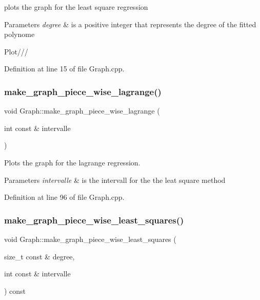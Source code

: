 plots the graph for the least square regression 


\begin{DoxyParams}{Parameters}
{\em degree} & is a positive integer that represents the degree of the fitted polynome \\
\hline
\end{DoxyParams}
Plot/// 

Definition at line 15 of file Graph.\+cpp.

\mbox{\label{class_graph_a4de7bd5074f188b470392920df1c7ada}} 
\subsubsection{\texorpdfstring{make\+\_\+graph\+\_\+piece\+\_\+wise\+\_\+lagrange()}{make\_graph\_piece\_wise\_lagrange()}}
{\footnotesize\ttfamily void Graph\+::make\+\_\+graph\+\_\+piece\+\_\+wise\+\_\+lagrange (\begin{DoxyParamCaption}\item[{int const \&}]{intervalle }\end{DoxyParamCaption})}



Plots the graph for the lagrange regression. 


\begin{DoxyParams}{Parameters}
{\em intervalle} & is the intervall for the the leat square method \\
\hline
\end{DoxyParams}


Definition at line 96 of file Graph.\+cpp.

\mbox{\label{class_graph_a00bb733092d1c97735b6fbc767a8cedf}} 
\subsubsection{\texorpdfstring{make\+\_\+graph\+\_\+piece\+\_\+wise\+\_\+least\+\_\+squares()}{make\_graph\_piece\_wise\_least\_squares()}}
{\footnotesize\ttfamily void Graph\+::make\+\_\+graph\+\_\+piece\+\_\+wise\+\_\+least\+\_\+squares (\begin{DoxyParamCaption}\item[{size\+\_\+t const \&}]{degree,  }\item[{int const \&}]{intervalle }\end{DoxyParamCaption}) const}




